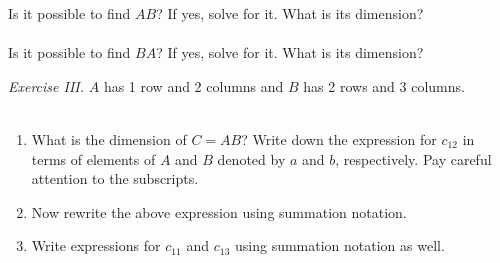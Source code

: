 \documentclass{./../../Latex/handout}
\begin{document}
Is it possible to find $AB$? If yes, solve for it. What is its dimension? \\~\\
Is it possible to find $BA$? If yes, solve for it. What is its dimension?

\newpage
\textit{Exercise III.} $A$ has 1 row and 2 columns and $B$  has 2 rows and 3 columns. \\~\\
\begin{enumerate}
\item What is the dimension of $C=AB$? Write down the expression for $c_{12}$ in terms of elements of $A$ and $B$ denoted by $a$ and $b$, respectively. Pay careful attention to the subscripts.
\vspace{7em}
\item Now rewrite the above expression using summation notation. 
\vspace{7em}
\item Write expressions for $c_{11}$ and $c_{13}$ using summation notation as well.
\end{enumerate}
\end{document}
